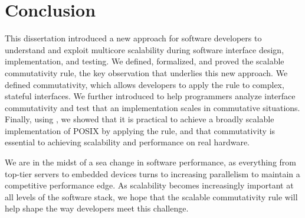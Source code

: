 \section{Conclusion}
\label{sec:concl}


This dissertation introduced a new approach for software developers to
understand and exploit multicore scalability during software interface
design, implementation, and testing.
%
We defined, formalized, and proved the scalable commutativity rule,
the key observation that underlies this new approach.
%
We defined \SIM commutativity, which allows developers to apply the
rule to complex, stateful interfaces.
%
We further introduced \tool to help programmers analyze interface
commutativity and test that an implementation scales in commutative
situations.
%
Finally, using \sys, we showed that it is practical to achieve a
broadly scalable implementation of POSIX by applying the rule, and
that commutativity is essential to achieving scalability and
performance on real hardware.







We are in the midst of a sea change in software performance, as
everything from top-tier servers to embedded devices turns to
increasing parallelism to maintain a competitive performance edge.
%
As scalability becomes increasingly important at all levels of the
software stack, we hope that the scalable commutativity rule will help
shape the way developers meet this challenge.
